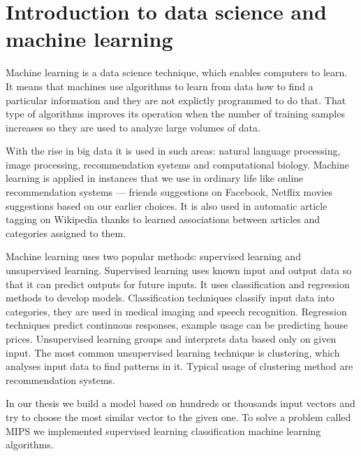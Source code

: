 \section{Introduction to data science and machine learning}

Machine learning is a data science technique, which enables computers to learn.
It means that machines use algorithms to learn from data how to find a particular information and
they are not explictly programmed to do that.
That type of algorithms improves its operation when the number of training samples increases so they are used to analyze large volumes of data.

With the rise in big data it is used in such areas: natural language processing, image processing, recommendation systems and computational biology. Machine learning is applied in instances that we use in ordinary life like online recommendation systems --- friends suggestions on Facebook, Netflix movies suggestions based on our earlier choices.
It is also used in automatic article tagging on Wikipedia thanks to learned
associations between articles and categories assigned to them.

Machine learning uses two popular methods: supervised learning and unsupervised learning.
Supervised learning uses known input and output data so that it can predict outputs for future inputs.
It uses classification and regression methods to develop models.
Classification techniques classify input data into categories, they are used in medical imaging and speech recognition.
Regression techniques predict continuous responses, example usage can be predicting house prices. Unsupervised learning groups and interprets data based only on given input.
The most common unsupervised learning technique is clustering,
which analyses input data to find patterns in it. 
Typical usage of clustering method are recommendation systems.

In our thesis we build a model based on hundreds or thousands input vectors and try to choose the most similar vector to the given one. 
To solve a problem called MIPS we implemented supervised learning classification machine learning algorithms.
